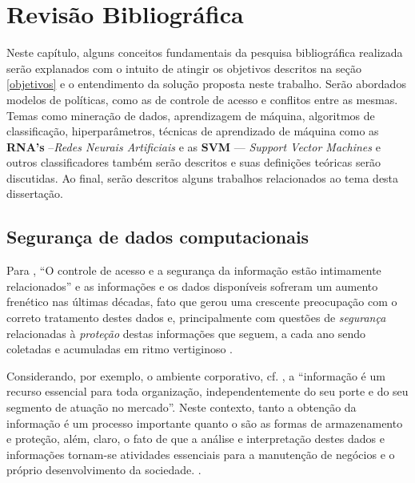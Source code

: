 \chapter{Revisão Bibliográfica}\label{referencial_teorico}
Neste capítulo, alguns conceitos fundamentais da pesquisa bibliográfica realizada serão explanados com o intuito de atingir os objetivos descritos na seção \ref{objetivos} e o entendimento da solução proposta neste trabalho. Serão abordados modelos de políticas, como as de controle de acesso e conflitos entre as mesmas. Temas como mineração de dados, aprendizagem de máquina, algoritmos de classificação, hiperparâmetros, técnicas de aprendizado de máquina como  as \textbf{RNA's} --\textit{Redes Neurais Artificiais} e as \textbf{SVM} --- \textit{Support Vector Machines} e outros classificadores também serão descritos e suas definições teóricas serão discutidas. Ao final, serão descritos alguns trabalhos relacionados ao tema desta dissertação.

\section{Segurança de dados computacionais} \label{seguranca_informacao}
Para , ``O controle de acesso e a segurança da informação estão intimamente relacionados'' e as informações e os dados disponíveis sofreram um aumento frenético nas últimas décadas, fato que gerou uma crescente preocupação com o correto tratamento destes dados e, principalmente com questões de \textit{segurança} relacionadas à \textit{proteção} destas informações que seguem, a cada ano sendo coletadas e acumuladas em ritmo vertiginoso \cite{alecrim2019, machado2014, lima_fraud_2012, fayyad1996, santos_segurancnos_2007}. 

Considerando, por exemplo, o ambiente corporativo, cf. , a ``informação é um recurso essencial para toda organização, independentemente do seu porte e do seu segmento de atuação no mercado''. Neste contexto, tanto a obtenção da informação é um processo importante quanto o são as formas de armazenamento e proteção, além, claro, o fato de que a análise e interpretação destes dados e informações tornam-se atividades essenciais para a manutenção de negócios e o próprio desenvolvimento da sociedade. \cite{Boscarioli2017} \cite{marciano_segurancda_nodate}.

